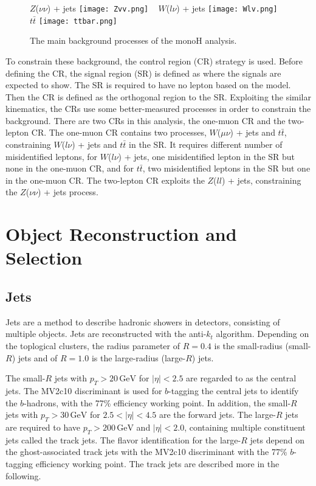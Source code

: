 \documentclass[class=NTHU_thesis, crop=false]{standalone}
\begin{document}
\begin{figure}[!hbt]
	\captionsetup[subfigure]{labelformat=empty}
	\centering
	\subcaptionbox
	{$Z$($\nu\nu$) + jets
		\label{fig:subfig_fig1}}
	{\texttt{[image: Zvv.png]}}
	~
	\subcaptionbox
	{$W$($l\nu$) + jets
		\label{fig:subfig_fig2}}
	{\texttt{[image: Wlv.png]}}
	~
	\subcaptionbox
	{$t\bar{t}$
		\label{fig:subfig_fig3}}
	{\texttt{[image: ttbar.png]}}
	\caption{The main background processes of the monoH analysis.}
	\label{fig:label}
\end{figure}

To constrain these background, the control region (CR) strategy is used. Before defining the CR, the signal region (SR) is defined as where the signals are expected to show. The SR is required to have no lepton based on the model. Then the CR is defined as the orthogonal region to the SR. Exploiting the similar kinematics, the CRs use some better-measured processes in order to constrain the background. There are two CRs in this analysis, the one-muon CR and the two-lepton CR. The one-muon CR contains two processes, $W$($\mu\nu$) + jets and $t\bar{t}$, constraining $W$($l\nu$) + jets and $t\bar{t}$ in the SR. It requires different number of misidentified leptons, for $W$($l\nu$) + jets, one misidentified lepton in the SR but none in the one-muon CR, and for $t\bar{t}$, two misidentified leptons in the SR but one in the one-muon CR. The two-lepton CR exploits the $Z$($ll$) + jets, constraining the $Z$($\nu\nu$) + jets process.

\section{Object Reconstruction and Selection}
\subsection{Jets}
Jets are a method to describe hadronic showers in detectors, consisting of multiple objects. Jets are reconstructed with the anti-$k_t$ algorithm. Depending on the toplogical clusters, the radius parameter of $R = 0.4$ is the small-radius (small-$R$) jets and of $R = 1.0$ is the large-radius (large-$R$) jets.

The small-$R$ jets with $p_T > 20\, \mathrm{GeV}$ for $\left|\eta\right| < 2.5$ are regarded to as the central jets. The MV2c10 discriminant is used for $b$-tagging the central jets to identify the $b$-hadrons, with the 77\% efficiency working point. In addition, the small-$R$ jets with $p_T > 30\, \mathrm{GeV}$ for $2.5 < \left|\eta\right| < 4.5$ are the forward jets. The large-$R$ jets are required to have $p_T > 200\, \mathrm{GeV}$ and $\left|\eta\right| < 2.0$, containing multiple constituent jets called the track jets. The flavor identification for the large-$R$ jets depend on the ghost-associated track jets with the MV2c10 discriminant with the 77\% $b$-tagging efficiency working point. The track jets are described more in the following.
\end{document}
